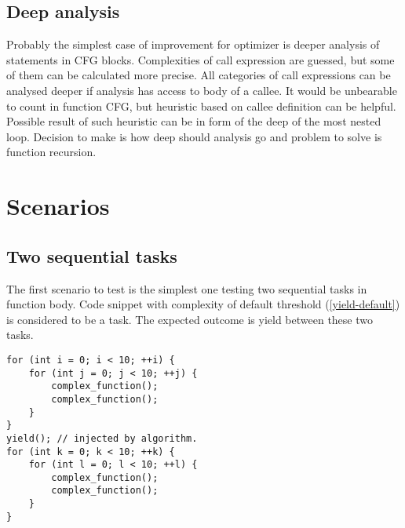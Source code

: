 \subsection{Deep analysis}
Probably the simplest case of improvement for optimizer is deeper analysis of statements in CFG blocks. Complexities of call expression are guessed, but some of them can be calculated more precise. All categories of call expressions can be analysed deeper if analysis has access to body of a callee. It would be unbearable to count in function CFG, but heuristic based on callee definition can be helpful. Possible result of such heuristic can be in form of the deep of the most nested loop. Decision to make is how deep should analysis go and problem to solve is function recursion.

\section{Scenarios}


\subsection{Two sequential tasks}
The first scenario to test is the simplest one testing two sequential tasks in function body. Code snippet with complexity of default threshold (\ref{yield-default}) is considered to be a task. The expected outcome is yield between these two tasks.

\begin{lstlisting}[caption={The first scenario with two sequential \textit{tasks}.}]
for (int i = 0; i < 10; ++i) {
    for (int j = 0; j < 10; ++j) {
        complex_function();
        complex_function();
    }
}
yield(); // injected by algorithm.
for (int k = 0; k < 10; ++k) {
    for (int l = 0; l < 10; ++l) {
        complex_function();
        complex_function();
    }
}
\end{lstlisting}

